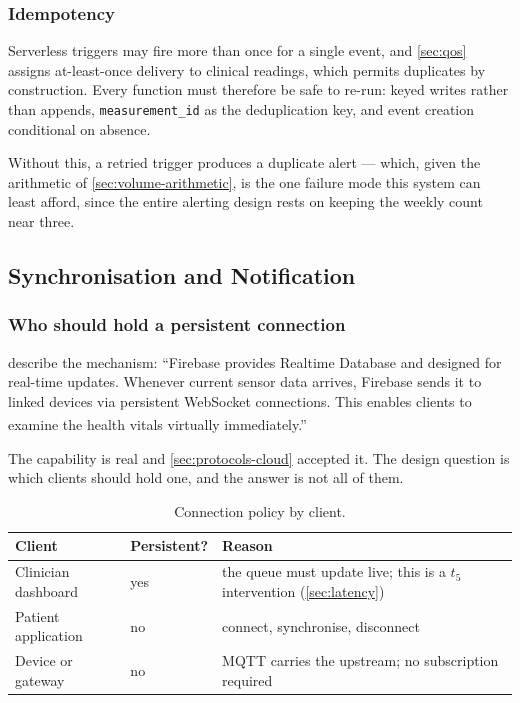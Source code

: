 \documentclass[12pt,a4paper,oneside]{report}
\newcommand{\bq}[1]{``#1''\textsuperscript{\dag}}
\begin{document}
\subsubsection{Idempotency}

Serverless triggers may fire more than once for a single event, and \cref{sec:qos} assigns at-least-once delivery to clinical readings, which permits duplicates by construction. Every function must therefore be safe to re-run: keyed writes rather than appends, \texttt{measurement\_id} as the deduplication key, and event creation conditional on absence.

Without this, a retried trigger produces a duplicate alert --- which, given the arithmetic of \cref{sec:volume-arithmetic}, is the one failure mode this system can least afford, since the entire alerting design rests on keeping the weekly count near three.

\subsection{Synchronisation and Notification}\label{sec:sync}

\subsubsection{Who should hold a persistent connection}\label{sec:connections}

\Textcite{efendi2025} describe the mechanism: \bq{Firebase provides Realtime Database and designed for real-time updates. Whenever current sensor data arrives, Firebase sends it to linked devices via persistent WebSocket connections. This enables clients to examine the health vitals virtually immediately.}

The capability is real and \cref{sec:protocols-cloud} accepted it. The design question is which clients should hold one, and the answer is not all of them.

\begin{table}[htbp]
\centering\small
\caption{Connection policy by client.}\label{tab:connection-policy}
\begin{tabularx}{\textwidth}{@{}>{\raggedright\arraybackslash}p{3.6cm} >{\raggedright\arraybackslash}p{2.4cm} X@{}}
\toprule
\textbf{Client} & \textbf{Persistent?} & \textbf{Reason} \\
\midrule
Clinician dashboard & yes & the queue must update live; this is a $t_5$ intervention (\cref{sec:latency}) \\
Patient application & no & connect, synchronise, disconnect \\
Device or gateway & no & MQTT carries the upstream; no subscription required \\
\bottomrule
\end{tabularx}
\end{table}
\end{document}
